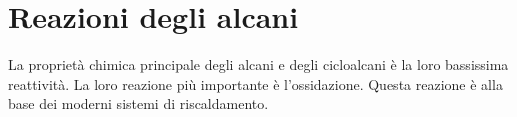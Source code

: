 \section{Reazioni degli alcani}
La proprietà chimica principale degli alcani e degli cicloalcani è la loro bassissima reattività. La loro reazione più importante è l'ossidazione. Questa reazione è alla base dei moderni sistemi di riscaldamento.

\begin{reaction*}
	 \qquad {}
\end{reaction*}
\begin{reaction*}
	 \qquad {}
\end{reaction*}